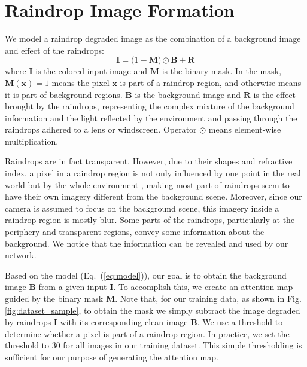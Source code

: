 \documentclass[10pt,twocolumn,letterpaper]{article}
\begin{document}
\section{Raindrop Image Formation}
\label{sec:image_formation}

We model a raindrop degraded image as the combination of a background image and effect of the raindrops:
\begin{equation}
\mathbf{I} = \mathbf(1 - \mathbf{M})\odot\mathbf{B} + \mathbf{R} 
\label{eq:model}
\end{equation}
where $\mathbf{I}$ is the colored input image and $\mathbf{M}$ is the binary mask. In the mask, $\mathbf{M}(\mathbf{x}) = 1$ means the pixel $\mathbf{x}$ is part of a raindrop region, and otherwise means it is part of background regions. $\mathbf{B}$ is the background image and $\mathbf{R}$ is the effect brought by the raindrops, representing the complex mixture of the background information and the light reflected by the environment  and passing through the raindrops adhered to a lens or windscreen. Operator $\odot$ means element-wise multiplication.


Raindrops are in fact transparent. However, due to their shapes and refractive index, a pixel in a raindrop region is not only influenced by one point in the real world but by the whole environment \cite{you2016adherent}, making most part of raindrops seem to have their own imagery different from the background scene. Moreover, since our camera is assumed to focus on the background scene, this imagery inside a raindrop region is mostly blur. Some parts of the raindrops, particularly at the periphery and transparent regions, convey some information about the background. We notice that the information can be revealed and used by our network.


Based on the model (Eq.~(\ref{eq:model})), our goal is to obtain the background image $\mathbf{B}$ from a given input $\mathbf{I}$. To accomplish this, we create an attention map guided by the binary mask $\mathbf{M}$. 
Note that, for our training data, as shown in Fig. \ref{fig:dataset_sample}, to obtain the mask we simply subtract the image degraded by raindrops $\mathbf{I}$ with its corresponding clean image $\mathbf{B}$. We use a threshold to determine whether a pixel is part of a raindrop region. In practice, we set the threshold to 30 for all images in our training dataset. This simple thresholding is sufficient for our purpose of generating the attention map.
\end{document}
